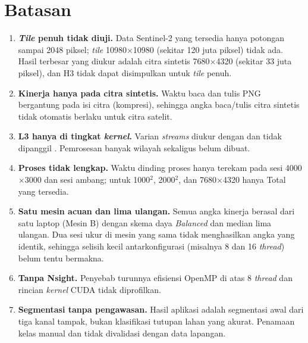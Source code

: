 \section{Batasan}
\label{sec:batasan}
\begin{enumerate}
    \item \textbf{\emph{Tile} penuh tidak diuji.} Data Sentinel-2 yang tersedia hanya potongan sampai 2048 piksel; \emph{tile} 10980$\times$10980 (sekitar 120 juta piksel) tidak ada. Hasil terbesar yang diukur adalah citra sintetis 7680$\times$4320 (sekitar 33 juta piksel), dan H3 tidak dapat disimpulkan untuk \emph{tile} penuh.
    \item \textbf{Kinerja hanya pada citra sintetis.} Waktu baca dan tulis PNG bergantung pada isi citra (kompresi), sehingga angka baca/tulis citra sintetis tidak otomatis berlaku untuk citra satelit.
    \item \textbf{L3 hanya di tingkat \emph{kernel}.} Varian \emph{streams} diukur dengan  dan tidak dipanggil . Pemrosesan banyak wilayah sekaligus belum dibuat.
    \item \textbf{Proses tidak lengkap.} Waktu dinding proses hanya terekam pada sesi 4000$\times$3000 dan sesi ambang; untuk 1000$^2$, 2000$^2$, dan 7680$\times$4320 hanya Total yang tersedia.
    \item \textbf{Satu mesin acuan dan lima ulangan.} Semua angka kinerja berasal dari satu laptop (Mesin B) dengan skema daya \emph{Balanced} dan median lima ulangan. Dua sesi ukur di mesin yang sama tidak menghasilkan angka yang identik, sehingga selisih kecil antarkonfigurasi (misalnya 8 dan 16 \emph{thread}) belum tentu bermakna.
    \item \textbf{Tanpa Nsight.} Penyebab turunnya efisiensi OpenMP di atas 8 \emph{thread} dan rincian \emph{kernel} CUDA tidak diprofilkan.
    \item \textbf{Segmentasi tanpa pengawasan.} Hasil aplikasi adalah segmentasi awal dari tiga kanal tampak, bukan klasifikasi tutupan lahan yang akurat. Penamaan kelas manual dan tidak divalidasi dengan data lapangan.
\end{enumerate}
